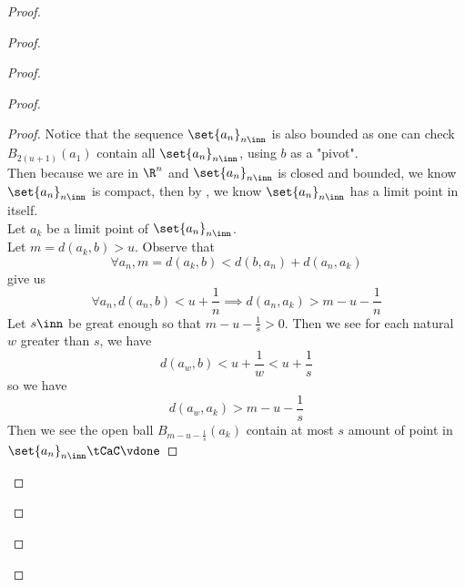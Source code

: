 \documentclass{report}
\begin{document}
\begin{proof}
\begin{proof}
\begin{proof}
\begin{proof}
\begin{proof}
Notice that the sequence $\set{a_n}_{n\inn}$ is also bounded as one can check $B_{2(u+1)}(a_1)$ contain all $\set{a_n}_{n\inn}$, using $b$ as a "pivot".\\

Then because we are in $\R^n$ and $\set{a_n}_{n\inn}$ is closed and bounded, we know $\set{a_n}_{n\inn}$ is compact, then by , we know $\set{a_n}_{n\inn}$ has a limit point in itself.\\

Let $a_k$ be a limit point of $\set{a_n}_{n\inn}$.\\

Let $m=d(a_k,b)>u$. Observe that 
\begin{equation*}
\forall a_n,m=d(a_k,b)<d(b,a_n)+d(a_n,a_k)
\end{equation*}
give us
\begin{equation*}
\forall a_n, d(a_n,b)<u+\frac{1}{n}\implies d(a_n,a_k)>m-u-\frac{1}{n}
\end{equation*}
Let $s\inn$ be great enough so that  $m-u-\frac{1}{s}>0$. Then we see for each natural $w$ greater than  $s$, we have
 \begin{equation*}
d(a_w,b)<u+\frac{1}{w}<u+\frac{1}{s}
\end{equation*}
so we have
\begin{equation*}
d(a_w,a_k)>m-u-\frac{1}{s}
\end{equation*}
Then we see the open ball $B_{m-u-\frac{1}{s}}(a_k)$ contain at most $s$ amount of point in  $\set{a_n}_{n\inn}\tCaC\vdone$

















\end{proof}
\end{proof}
\end{proof}
\end{proof}
\end{proof}
\end{document}
